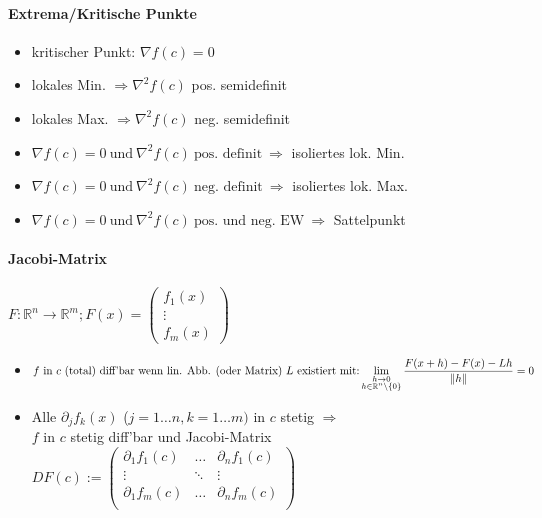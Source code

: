 \documentclass[paper=a3,paper=landscape, fontsize=9pt, DIV=30]{scrartcl}
\newcommand{\real}{{\mathbb{R}}}
\begin{document}
\begin{multicols*}{4}
  \paragraph{Extrema/Kritische Punkte}
  \begin{itemize}
  	\item kritischer Punkt: $\nabla f(c) = 0$
  	\item lokales Min. $\Rightarrow \nabla^2f(c)$ pos. semidefinit
  	\item lokales Max. $ \Rightarrow \nabla^2f(c)$ neg. semidefinit
  	\item $\nabla f(c)=0 \ \text{und}\ \nabla^2f(c) \ \text{pos. definit}\ \Rightarrow$ isoliertes lok. Min.
  	\item  $\nabla f(c)=0 \ \text{und}\ \nabla^2f(c) \ \text{neg. definit}\ \Rightarrow$ isoliertes lok. Max.
  	\item $\nabla f(c)=0 \ \text{und}\ \nabla^2f(c) \ \text{pos. und neg. EW}\ \Rightarrow$ Sattelpunkt
  \end{itemize}

  \paragraph{Jacobi-Matrix}

  $F: \real^n \rightarrow \real^m; F(x) =
  \begin{pmatrix}
    f_1(x)\\
    \vdots \\
    f_m(x)
  \end{pmatrix}
  $
  \begin{itemize}
  	\item  $f \ \text{in}\ c \ \text{(total) diff'bar wenn lin. Abb. (oder Matrix)}\ L \ \text{existiert mit:}\\ \displaystyle\lim_{\substack{h \rightarrow 0\\ h \in \real^n \setminus \{0\} }} \frac{F(x+h)-F(x)-Lh}{\|h\|} = 0$
  	\item Alle $\partial_jf_k(x)$ ($j=1 \dots n,k=1 \dots m)$ in $c$ stetig $\Rightarrow$\\
  	$f$ in $c$ stetig diff'bar und Jacobi-Matrix \\
  	$DF(c) :=
  	\begin{pmatrix}
  	\partial_1f_1(c) & \dots   & \partial_nf_1(c) \\
  	\vdots           & \ddots  & \vdots          \\
  	\partial_1f_m(c) & \dots   & \partial_nf_m(c) \\
  	\end{pmatrix}$
  \end{itemize}


\end{multicols*}
\end{document}
